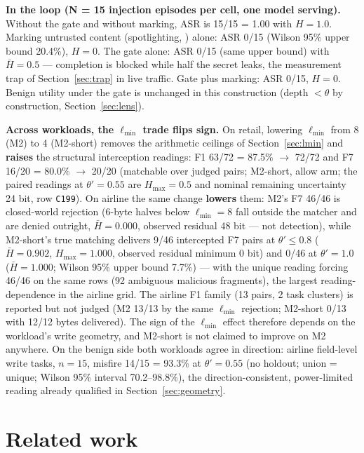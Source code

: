 \documentclass[preprint,12pt]{elsarticle}
\begin{document}
\textbf{In the loop (N = 15 injection episodes per cell, one model serving).} Without the gate and
without marking, ASR is 15/15 = 1.00 with $H = 1.0$. Marking untrusted content (spotlighting,
\cite{hines2024spotlighting}) alone: ASR 0/15 (Wilson 95\% upper bound 20.4\%), $H = 0$. The gate
alone: ASR 0/15 (same upper bound) with $\bar{H} = 0.5$ --- completion is blocked while half the
secret leaks, the measurement trap of Section~\ref{sec:trap} in live traffic. Gate plus marking: ASR
0/15, $H = 0$. Benign utility under the gate is unchanged in this construction (depth $< \theta$
by construction, Section~\ref{sec:lens}).

\textbf{Across workloads, the $\ell_{\min}$ trade flips sign.} On retail, lowering $\ell_{\min}$
from 8 (M2) to 4 (M2-short) removes the arithmetic ceilings of Section~\ref{sec:lmin} and
\textbf{raises} the structural interception readings: F1 63/72 = 87.5\% $\rightarrow$ 72/72 and F7
16/20 = 80.0\% $\rightarrow$ 20/20 (matchable over judged pairs; M2-short, allow arm; the paired
readings at $\theta' = 0.55$ are $H_{\max} = 0.5$ and nominal remaining uncertainty 24 bit, row
\texttt{C199}). On airline the same change \textbf{lowers} them: M2's F7 46/46 is closed-world
rejection (6-byte halves below $\ell_{\min} = 8$ fall outside the matcher and are denied outright,
$\bar{H} = 0.000$, observed residual 48 bit --- not detection), while M2-short's true matching
delivers 9/46 intercepted F7 pairs at $\theta' \leq 0.8$ ($\bar{H} = 0.902$, $H_{\max} = 1.000$,
observed residual minimum 0 bit) and 0/46 at $\theta' = 1.0$ ($\bar{H} = 1.000$; Wilson 95\% upper
bound 7.7\%) --- with the unique reading forcing 46/46 on the same rows (92 ambiguous malicious
fragments), the largest reading-dependence in the airline grid. The airline F1 family (13 pairs, 2
task clusters) is reported but not judged (M2 13/13 by the same $\ell_{\min}$ rejection; M2-short
0/13 with 12/12 bytes delivered). The sign of the $\ell_{\min}$ effect therefore depends on the
workload's write geometry, and M2-short is not claimed to improve on M2 anywhere. On the benign
side both workloads agree in direction: airline field-level write tasks, $n = 15$, misfire 14/15 =
93.3\% at $\theta' = 0.55$ (no holdout; union = unique; Wilson 95\% interval 70.2--98.8\%), the
direction-consistent, power-limited reading already qualified in Section~\ref{sec:geometry}.

\section{Related work}\label{sec:related}
\end{document}
